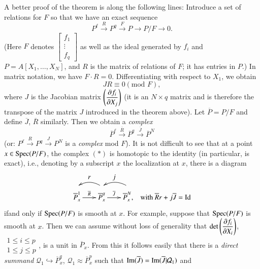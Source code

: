 \begin{remark}\label{part1-rem2.1}
A better proof of the theorem is along the following lines: Introduce
a set of relations for $F$ so that we have an exact sequence
$$
P^{\ell}\xrightarrow{R}P^{q}\xrightarrow{F}P\to P/F\to 0.
$$
(Here $F$ denotes $\left[\begin{smallmatrix}
    f_{1}\\ \vdots\\ f_{q}\end{smallmatrix}\right]$ as well as the
ideal generated by $f_{i}$ and $P=A[X_{1},\ldots,X_{N}]$, and $R$ is
the matrix of relations of $F$; it has entries in $P$.) In matrix
notation, we have $F\cdot R=0$. Differentiating with respect to
$X_{1}$, we obtain 
$$
JR\equiv 0(\text{mod~}F),
$$
where $J$ is the Jacobian matrix $\left(\dfrac{\partial f_{i}}{\partial
  X_{j}}\right)$ (it is an $N\times q$ matrix and is therefore the
transpose of the matrix $J$ introduced in the theorem above). Let
$\overline{P}=P/F$ and define $\overline{J}$, $\overline{R}$
similarly. Then we obtain a {\em complex}
\begin{equation*}
\overline{P}^{\ell}\xrightarrow{\overline{R}}\overline{P}^{q}\xrightarrow{\overline{J}}\overline{P}^{N}\tag{*} 
\end{equation*}
(or: $P^{\ell}\xrightarrow{R}P^{q}\xrightarrow{J}P^{N}$ is a {\em
  complex} mod $F$). It is not difficult to see that at a point $x\in
\operatorname{Spec} (P/F)$, the complex $(*)$ is homotopic to the identity (in
particular, is exact), i.e., denoting by a subscript $x$ the
localization at $x$, there is a diagram
\[
\xymatrix@C=.15cm@R=.1cm{
 & r & & j & & \\
 &  & \ar@/_/[ll] &   &\ar@/_/[ll] & \\
\overline{P}^{1}_{x}\ar[rr]^-{\overline{R}} & &
\overline{P}^{q}_{x}\ar[rr]^-{\overline{J}} & &
\overline{P}^{N}_{x}, & \text{with~ }
\overline{R}r+j\overline{J}=\text{Id}  
}
\]
if\pageoriginale and only if $\operatorname{Spec} (P/F)$ is smooth at $x$. For
example, suppose that $\operatorname{Spec} (P/F)$ is smooth at $x$. Then we can
assume without loss of generality that $\det\left(\dfrac{\partial f_{i}}{\partial
  X_{i}}\right)$, $\begin{smallmatrix} 1\leq i\leq p\\ 1\leq j\leq
  p\end{smallmatrix}$, is a unit in $\overline{P}_{x}$. From this it
  follows easily that there is a {\em direct summand}
  $\mathcal{Q}_{1}\hookrightarrow \overline{P}^{q}_{x}$,
  $\mathcal{Q}_{1}\approx \overline{P}^{p}_{x}$ such that $\operatorname{Im}
  (\overline{J})=\operatorname{Im}(\overline{J}|\mathcal{Q}_{1})$ and

\end{remark}
